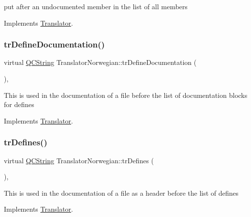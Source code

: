 put after an undocumented member in the list of all members 

Implements \mbox{\hyperlink{class_translator}{Translator}}.

\mbox{\label{class_translator_norwegian_ae61cb9a7ba62824659649b33da0dfe0d}} 
\subsubsection{\texorpdfstring{trDefineDocumentation()}{trDefineDocumentation()}}
{\footnotesize\ttfamily virtual \mbox{\hyperlink{class_q_c_string}{Q\+C\+String}} Translator\+Norwegian\+::tr\+Define\+Documentation (\begin{DoxyParamCaption}{ }\end{DoxyParamCaption})\hspace{0.3cm}{\ttfamily [inline]}, {\ttfamily [virtual]}}

This is used in the documentation of a file before the list of documentation blocks for defines 

Implements \mbox{\hyperlink{class_translator}{Translator}}.

\mbox{\label{class_translator_norwegian_a530dd3cfaf5ca077cea50df989421779}} 
\subsubsection{\texorpdfstring{trDefines()}{trDefines()}}
{\footnotesize\ttfamily virtual \mbox{\hyperlink{class_q_c_string}{Q\+C\+String}} Translator\+Norwegian\+::tr\+Defines (\begin{DoxyParamCaption}{ }\end{DoxyParamCaption})\hspace{0.3cm}{\ttfamily [inline]}, {\ttfamily [virtual]}}

This is used in the documentation of a file as a header before the list of defines 

Implements \mbox{\hyperlink{class_translator}{Translator}}.

\mbox{\label{class_translator_norwegian_abbba5c7fcdb5c95a4f58ad017606e738}} 
